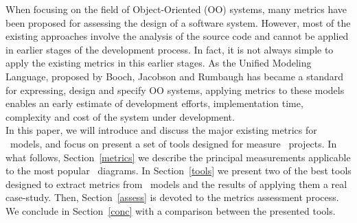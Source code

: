 When focusing on the field of Object-Oriented (OO) systems, many metrics have been proposed for assessing the design of a software system.
However, most of the existing approaches involve the analysis of the source code and cannot be applied in earlier stages of the development process.
In fact, it is not always simple to apply the existing metrics in this earlier stages. 
As the \textsf{Unified Modeling Language}, proposed by Booch, Jacobson and Rumbaugh\cite{USDPuml} has became a standard for expressing, design and specify OO systems, applying metrics to these models enables an early estimate of development efforts, implementation time, complexity and cost of the system under development. \\

In this paper, we will introduce and discuss the major existing metrics for \uml\ models, and focus on present a set of tools designed for measure \uml\ projects.
In what follows, Section~\ref{metrics} we describe the principal measurements applicable to the most popular \uml\ diagrams.
In Section~\ref{tools} we present two of the best tools designed to extract metrics from \uml\ models and the results of applying them a real case-study.
Then, Section~\ref{assess} is devoted to the metrics assessment process.
We conclude in Section~\ref{conc} with a comparison between the presented tools.

